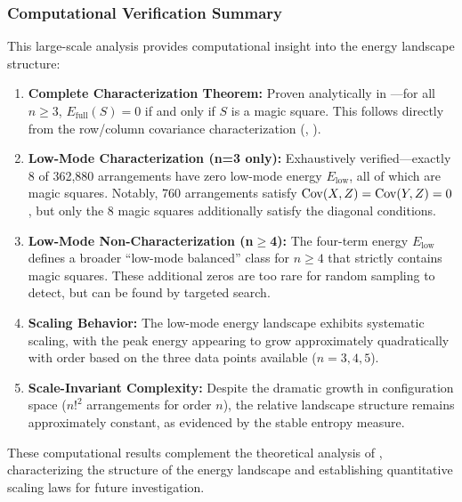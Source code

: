 \subsubsection{Computational Verification Summary}

This large-scale analysis provides computational insight into the energy landscape structure:

\begin{enumerate}
\item \textbf{Complete Characterization Theorem:} Proven analytically in ---for 
all $n \geq 3$, $E_{\mathrm{full}}(S) = 0$ if and only if $S$ is a magic square.
This follows directly from the row/column covariance characterization 
(, ).

\item \textbf{Low-Mode Characterization (n=3 only):} Exhaustively verified---exactly 8 of 362,880 
arrangements have zero low-mode energy $E_{\mathrm{low}}$, all of which are magic squares.
Notably, 760 arrangements satisfy $\mathrm{Cov}(X,Z) = \mathrm{Cov}(Y,Z) = 0$, but only the 8 magic squares
additionally satisfy the diagonal conditions.

\item \textbf{Low-Mode Non-Characterization (n$\geq$4):} The four-term energy $E_{\mathrm{low}}$ 
defines a broader ``low-mode balanced'' class for $n \geq 4$ that strictly contains magic squares.
These additional zeros are too rare for random sampling to detect, but can be found by targeted search.

\item \textbf{Scaling Behavior:} The low-mode energy landscape exhibits systematic scaling,
with the peak energy appearing to grow approximately quadratically with order 
based on the three data points available ($n=3,4,5$).

\item \textbf{Scale-Invariant Complexity:} Despite the dramatic growth in configuration space
($n!^2$ arrangements for order $n$), the relative landscape structure remains approximately constant,
as evidenced by the stable entropy measure.
\end{enumerate}

These computational results complement the theoretical analysis of ,
characterizing the structure of the energy landscape
and establishing quantitative scaling laws for future investigation.
